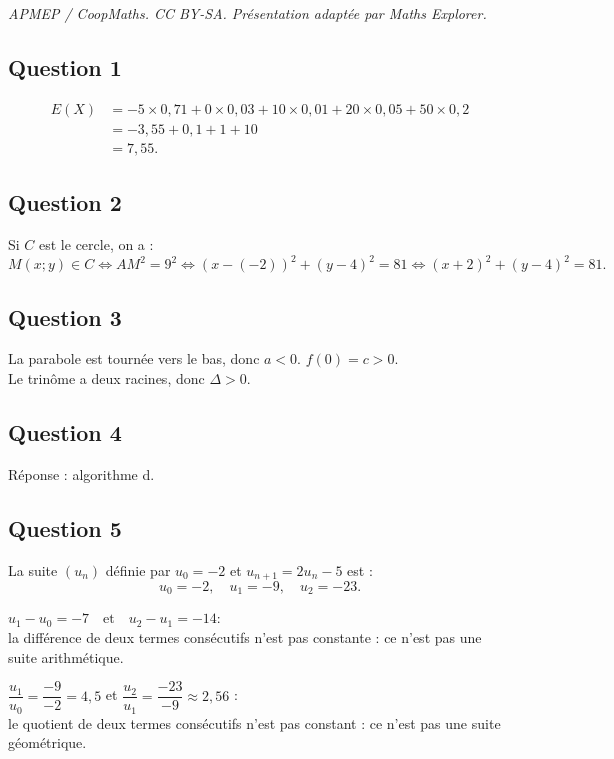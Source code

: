 \documentclass[10pt]{article}
\begin{document}
\noindent\textit{APMEP / CoopMaths. CC BY-SA. Présentation adaptée par Maths Explorer.}\par\medskip
\subsection*{Question 1}
	
	\begin{align*}
E(X) &= -5 \times 0,71 + 0 \times 0,03 + 10 \times 0,01 + 20 \times 0,05 + 50 \times 0,2\\
& = -3,55 + 0,1 + 1 + 10\\
& = 7,55.
	\end{align*}
	
	\subsection*{Question 2}
	
	Si \(C\) est le cercle, on a :
	\[
	M(x ; y) \in C \Leftrightarrow AM^2 = 9^2 \Leftrightarrow (x - (-2))^2 + (y - 4)^2 = 81 \Leftrightarrow (x + 2)^2 + (y - 4)^2 = 81.
	\]
	
	\subsection*{Question 3}
	
	La parabole est tournée vers le bas, donc \(a < 0\). \(f(0) = c > 0\).\\
	 Le trinôme a deux racines, donc \(\Delta > 0\).
	
	\subsection*{Question 4}
	
	Réponse : algorithme d.
	
	\subsection*{Question 5}
	
	La suite \((u_n)\) définie par \(u_0 = -2\) et \(u_{n+1} = 2u_n - 5\) est :
	\[
	u_0 = -2, \quad u_1 = -9, \quad u_2 = -23.
	\]
	
$u_1 - u_0 = -7 \quad \text{et} \quad u_2 - u_1 = -14$:\\
la différence de deux termes consécutifs n'est pas constante : ce n'est pas une suite arithmétique.
	
	
$\dfrac{u_1}{u_0} = \dfrac{-9}{-2} = 4,5 $ et  $\dfrac{u_2}{u_1} = \dfrac{-23}{-9} \approx 2,56$ :\\  le quotient de deux termes consécutifs n'est pas constant : ce n'est pas une suite géométrique.
\end{document}
